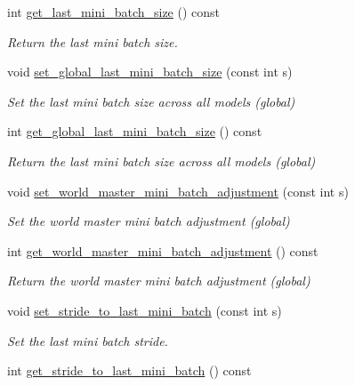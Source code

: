 \begin{DoxyCompactItemize}
int \hyperlink{classlbann_1_1generic__data__reader_a79cb3bee4e0d19006ef9213763dc8af2}{get\+\_\+last\+\_\+mini\+\_\+batch\+\_\+size} () const
\begin{DoxyCompactList}\small\item\em Return the last mini batch size. \end{DoxyCompactList}\item 
void \hyperlink{classlbann_1_1generic__data__reader_a4455d137b469287bf964436f9fcc6d94}{set\+\_\+global\+\_\+last\+\_\+mini\+\_\+batch\+\_\+size} (const int s)
\begin{DoxyCompactList}\small\item\em Set the last mini batch size across all models (global) \end{DoxyCompactList}\item 
int \hyperlink{classlbann_1_1generic__data__reader_a96bb5c116c1a23822f6662b866df4a17}{get\+\_\+global\+\_\+last\+\_\+mini\+\_\+batch\+\_\+size} () const
\begin{DoxyCompactList}\small\item\em Return the last mini batch size across all models (global) \end{DoxyCompactList}\item 
void \hyperlink{classlbann_1_1generic__data__reader_a208cebb68cf3c1ae1bd9cb5f28e8bf5b}{set\+\_\+world\+\_\+master\+\_\+mini\+\_\+batch\+\_\+adjustment} (const int s)
\begin{DoxyCompactList}\small\item\em Set the world master mini batch adjustment (global) \end{DoxyCompactList}\item 
int \hyperlink{classlbann_1_1generic__data__reader_a0d0f7d684970b5cc59c63050555df302}{get\+\_\+world\+\_\+master\+\_\+mini\+\_\+batch\+\_\+adjustment} () const
\begin{DoxyCompactList}\small\item\em Return the world master mini batch adjustment (global) \end{DoxyCompactList}\item 
void \hyperlink{classlbann_1_1generic__data__reader_af2fc6b35ad8139d15729b19db2895827}{set\+\_\+stride\+\_\+to\+\_\+last\+\_\+mini\+\_\+batch} (const int s)
\begin{DoxyCompactList}\small\item\em Set the last mini batch stride. \end{DoxyCompactList}\item 
int \hyperlink{classlbann_1_1generic__data__reader_a722a28971b6799566dc21ba552a4cde6}{get\+\_\+stride\+\_\+to\+\_\+last\+\_\+mini\+\_\+batch} () const

\end{DoxyCompactItemize}

